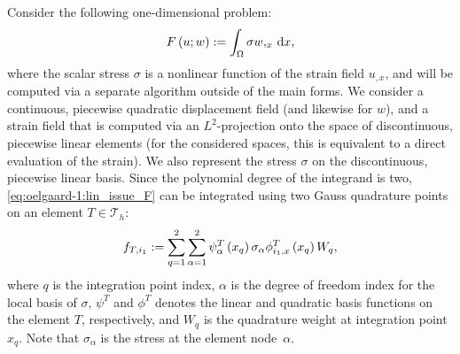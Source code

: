 Consider the following one-dimensional problem:
%
\begin{equation}
\label{eq:oelgaard-1:lin_issue_F}
F\left( {u; w} \right) := \int_{\Omega} \sigma w,_{x} \, \mathrm{d}x,
\end{equation}
%
where the scalar stress $\sigma$ is a nonlinear function of the strain
field $u_{,x}$, and will be computed via a separate algorithm outside of
the main forms. We consider a continuous, piecewise quadratic displacement
field (and likewise for $w$), and a strain field that is computed via
an $L^2$-projection onto the space of discontinuous, piecewise linear
elements (for the considered spaces, this is equivalent to a direct
evaluation of the strain).  We also represent the stress $\sigma$ on the
discontinuous, piecewise linear basis.  Since the polynomial degree of
the integrand is two, \eqref{eq:oelgaard-1:lin_issue_F} can be integrated
using two Gauss quadrature points on an element $T \in \mathcal{T}_h$:
%
\begin{equation}
\label{eq:oelgaard-1:lin_issue_f}
f_{T,i_{1}} := \sum_{q=1}^2 \sum_{\alpha=1}^2 \psi^{T}_{\alpha}\left( {x_{q}} \right) \sigma_{\alpha}
\phi^{T}_{i_{1},x}\left( {x_q} \right) W_{q},
\end{equation}
%
where $q$ is the integration point index, $\alpha$ is the degree of freedom
index for the local basis of $\sigma$, $\psi^{T}$ and $\phi^{T}$ denotes
the linear and quadratic basis functions on the element $T$, respectively,
and $W_{q}$ is the quadrature weight at integration point~$x_{q}$.
Note that $\sigma_{\alpha}$ is the stress at the element node~$\alpha$.

